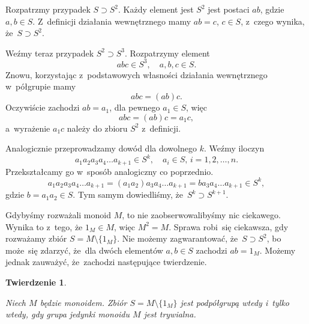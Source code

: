 \documentclass[a4paper,11pt]{article}
\newtheorem{theorem}{Twierdzenie}  %
\begin{document}
Rozpatrzmy przypadek $S \supset S^{ 2 }$. Każdy element jest $S^{ 2 }$ jest
postaci $ab$, gdzie $a, b \in S$. Z~definicji działania wewnętrznego mamy
$ab = c$, $c \in S$, z~czego wynika, że~$S \supset S^{ 2 }$.

Weźmy teraz przypadek $S^{ 2 } \supset S^{ 3 }$. Rozpatrzymy element
\begin{equation}
  \label{eq:Forys-Forys-24}
  abc \in S^{ 3 }, \quad a, b, c \in S.
\end{equation}
Znowu, korzystając z~podstawowych własności działania wewnętrznego
w~półgrupie mamy
\begin{equation}
  \label{eq:Forys-Forys-25}
  abc = ( ab ) c.
\end{equation}
Oczywiście zachodzi $ab = a_{ 1 }$, dla pewnego $a_{ 1 } \in S$, więc
\begin{equation}
  \label{eq:Forys-Forys-26}
  abc = ( ab ) c = a_{ 1 } c,
\end{equation}
a~wyrażenie $a_{ 1 } c$ należy do zbioru $S^{ 2 }$ z~definicji.

Analogicznie przeprowadzamy dowód dla dowolnego $k$. Weźmy iloczyn
\begin{equation}
  \label{eq:Forys-Forys-27}
  a_{ 1 } a_{ 2 } a_{ 3 } a_{ 4 } \ldots a_{ k + 1 } \in S^{ k }, \quad
  a_{ i } \in S,\, i = 1, 2, \ldots, n.
\end{equation}
Przekształcamy go w~sposób analogiczny co poprzednio.
\begin{equation}
  \label{eq:Forys-Forys-28}
  a_{ 1 } a_{ 2 } a_{ 3 } a_{ 4 } \ldots a_{ k + 1 } =
  ( a_{ 1 } a_{ 2 } ) a_{ 3 } a_{ 4 } \ldots a_{ k + 1 } =
  b a_{ 3 } a_{ 4 } \ldots a_{ k + 1 } \in S^{ k },
\end{equation}
gdzie $b = a_{ 1 } a_{ 2 } \in S$. Tym samym dowiedliśmy,
że~$S^{ k } \supset S^{ k + 1 }$.

Gdybyśmy rozważali monoid $M$, to nie zaobserwowalibyśmy nic ciekawego.
Wynika to z~tego, że $1_{ M } \in M$, więc $M^{ 2 } = M$. Sprawa robi~się
ciekawsza, gdy rozważamy zbiór $S = M \setminus \{ 1_{ M } \}$. Nie możemy
zagwarantować, że~$S \supset S^{ 2 }$, bo może~się zdarzyć, że~dla dwóch
elementów $a, b \in S$ zachodzi $a b = 1_{ M }$. Możemy jednak zauważyć,
że~zachodzi następujące twierdzenie.





\begin{theorem}
  \label{thm:Forys-Forys-01}

  Niech $M$ będzie monoidem. Zbiór $S = M \setminus \{ 1_{ M } \}$ jest podpółgrupą
  wtedy i~tylko wtedy, gdy grupa jedynki monoidu $M$ jest trywialna.

\end{theorem}
\end{document}
